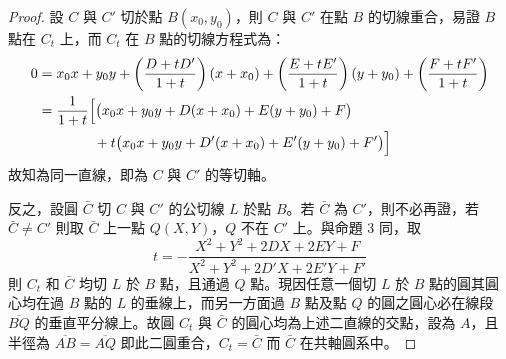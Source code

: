 \begin{proof}
設 $C$ 與 $C'$ 切於點 $B(x_0, y_0)$，則 $C$ 與 $C'$ 在點 $B$ 的切線重合，易證 $B$ 點在 $C_t$ 上，而 $C_t$ 在 $B$ 點的切線方程式為：
\begin{align*}
0 &= x_0 x + y_0 y + \left(\frac{D+tD'}{1+t}\right)(x+x_0) + \left(\frac{E+tE'}{1+t}\right)(y+y_0) + \left(\frac{F+tF'}{1+t}\right) \\
&= \frac{1}{1+t} \Bigl[\bigl(x_0 x + y_0 y + D(x+x_0) + E(y+y_0) + F\bigr) \\
&\qquad\qquad + t\bigl(x_0 x + y_0 y + D'(x+x_0) + E'(y+y_0) + F'\bigr)\Bigr]
\end{align*}
故知為同一直線，即為 $C$ 與 $C'$ 的等切軸。

反之，設圓 $\bar{C}$ 切 $C$ 與 $C'$ 的公切線 $L$ 於點 $B$。若 $\bar{C}$ 為 $C'$，則不必再證，若 $\bar{C} \neq C'$ 則取 $\bar{C}$ 上一點 $Q(X, Y)$，$Q$ 不在 $C'$ 上。與命題 3 同，取
\[
t = -\frac{X^2+Y^2+2DX+2EY+F}{X^2+Y^2+2D'X+2E'Y+F'}
\]
則 $C_t$ 和 $\bar{C}$ 均切 $L$ 於 $B$ 點，且通過 $Q$ 點。現因任意一個切 $L$ 於 $B$ 點的圓其圓心均在過 $B$ 點的 $L$ 的垂線上，而另一方面過 $B$ 點及點 $Q$ 的圓之圓心必在線段 $\overline{BQ}$ 的垂直平分線上。故圓 $C_t$ 與 $\bar{C}$ 的圓心均為上述二直線的交點，設為 $A$，且半徑為 $\overline{AB}=\overline{AQ}$ 即此二圓重合，$C_t=\bar{C}$ 而 $\bar{C}$ 在共軸圓系中。
\end{proof}

\begin{center}
\end{center}

